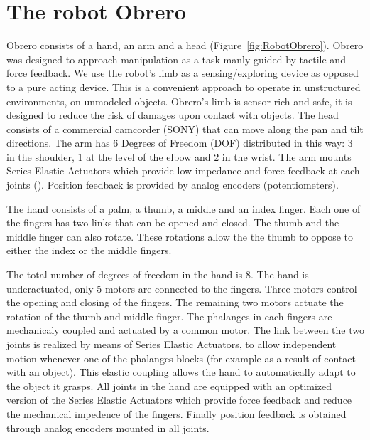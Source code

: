 \section{The robot Obrero}
\label{sec:platform}

Obrero \cite{obrero} 
consists of a hand, an arm and a head (Figure~\ref{fig:RobotObrero}). 
Obrero was designed to approach manipulation as a task manly guided by
tactile and force feedback.
We use the robot's limb as a sensing/exploring device as opposed 
to a pure acting device. This is a convenient approach to operate 
in unstructured environments, on unmodeled objects. 
Obrero's limb is sensor-rich and
safe, it is designed to reduce the risk of damages upon contact
with objects. The head consists of a commercial camcorder (SONY) 
that can move along the pan and tilt directions. The arm has 6 
Degrees of Freedom (DOF) distributed in this way: 3 in the shoulder, 1 at the level of 
the elbow and 2 in the wrist. The arm mounts Series Elastic Actuators 
\cite{williamson95series} which provide low-impedance and force feedback 
at each joints (\cite{domo}). Position feedback is provided by 
analog encoders (potentiometers).

The hand consists of a palm, a thumb, a middle and an
index finger. Each one of the fingers has two links that can be
opened and closed. The thumb and the middle finger can also
rotate. These rotations allow the the thumb to oppose to either 
the index or the middle fingers.


The total number of degrees of freedom in the hand is 8. The hand 
is underactuated, only 5 motors are connected to the fingers. Three motors control
the opening and closing of the fingers. The remaining two motors actuate
the rotation of the thumb and middle finger. The phalanges in each fingers 
are mechanicaly coupled and actuated by a common motor. The link between 
the two joints is realized by means of Series 
Elastic Actuators, to allow independent motion 
whenever one of the phalanges blocks (for example as a result of contact 
with an object). This elastic coupling allows the hand to automatically 
adapt to the object it grasps. All joints in the hand are equipped with an 
optimized version of the Series Elastic Actuators \cite{actuator} which provide 
force feedback and reduce the mechanical impedence of the fingers. Finally 
position feedback is obtained through analog encoders mounted in all joints. 

